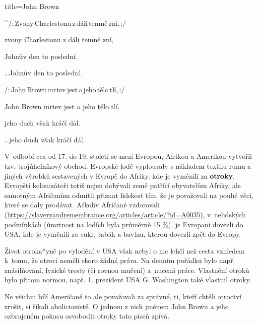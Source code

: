 \begin{song}{title=\predtitle \centering John Brown \\\large  }
{\begin{centerjustified}
\begin{varwidth}[t]{0.55\textwidth}
\sloka
^{}/:\,Zvony\,Charlestonu\,z\,dáli\,temně\,zní,\,:/

zvony Charlestonu z dáli temně zní,

Johnův den to poslední.

\dots  Johnův den to poslední.

\sloka
/:\,John\,Brown\,mrtev\,jest\,a\,jeho\,tělo\,tlí,\,:/

John Brown mrtev jest a jeho tělo tlí,

jeho duch však kráčí dál.

\dots  jeho duch však kráčí dál.

\end{varwidth}
\end{centerjustified}

\hrulefill

V~odbobí cca od 17. do 19. století se mezi Evropou, Afrikou a Amerikou vytvořil
tzv. trojúhelníkový obchod. Evropské lodě vyplouvaly s nákladem textilu rumu a jiných
výrobků sestavených v Evropě do Afriky, kde je vyměnili za \textbf{otroky}.
Evropští kolonizátoři totiž nejen dobývali země patřící obyvatelům Afriky, ale samotným Afričanům
odmítli přiznat lidskost tím, že je považovali na pouhé věci, které se daly prodávat.
Ačkoliv Afričané vzdorovali (\url{https://slaveryandremembrance.org/articles/article/?id=A0035}),
v~nelidských podmínkách (úmrtnost na lodích byla průměrně 15 \%), je Evropani dovezli do
USA, kde je vyměnili za cukr, tabák a bavlnu, kterou dovezli zpět do Evropy.

Život otroka*yně po vylodění v USA však nebyl o nic lehčí než cesta vzhledem
k~tomu, že otroci neměli skoro žádná práva. Na denním pořádku bylo např.
znásilňování, fyzické tresty (či rovnou mučení) a~nucená práce. Vlastnění
otroků bylo přitom normou, např. 1. prezident USA G. Washington také vlastnil
otroky.

Ne všichni bílí Američané to ale považovali za správné, ti, kteří chtěli
otroctví zrušit, si říkali abolicionisté. O jednom z nich jménem John Brown
a jeho ozbrojeném pokusu osvobodit otroky tato píseň zpívá.

}




\setcounter{Slokočet}{0}
\end{song}

